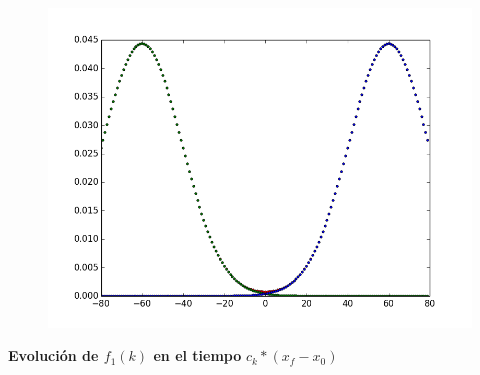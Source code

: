 \documentclass{article}
\begin{document}
\begin{description}
\item \begin{figure}[!ht] 
 \centering 
 \includegraphics[scale=0.5]{gauss.png} 
\end{figure} 

\end{description}
\textbf{Evolución de $f_1(k)$ en el tiempo}  $c_k * (x_f - x_0)$
\end{document}
